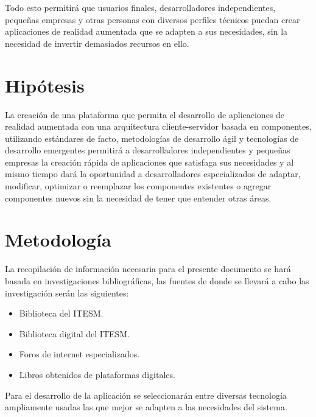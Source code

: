 \documentclass[12pt,a4paper,spanish,openany]{book}
\begin{document}

Todo esto permitirá que usuarios finales, desarrolladores
independientes, pequeñas empresas y otras personas con diversos perfiles
técnicos puedan crear aplicaciones de realidad aumentada que se adapten a sus
necesidades, sin la necesidad de invertir demasiados recursos en ello.


\section{Hipótesis}
La creación de una plataforma que permita el desarrollo de aplicaciones de
realidad aumentada con una arquitectura cliente-servidor basada en componentes,
utilizando estándares de facto, metodologías de desarrollo ágil y tecnologías de
desarrollo emergentes permitirá a desarrolladores independientes y
pequeñas empresas la creación rápida de aplicaciones que satisfaga
sus necesidades y al mismo tiempo dará la oportunidad a desarrolladores
especializados de adaptar, modificar, optimizar o reemplazar los
componentes existentes o agregar componentes nuevos sin la necesidad de tener
que entender otras áreas.

\section{Metodología}

La recopilación de información necesaria para el presente documento se hará
basada en investigaciones bibliográficas, las fuentes de donde se llevará a
cabo las investigación serán las siguientes:
\begin{itemize}
  \item Biblioteca del ITESM.
  \item Biblioteca digital del ITESM.
  \item Foros de internet especializados.
  \item Libros obtenidos de plataformas digitales.
\end{itemize}

Para el desarrollo de la aplicación se seleccionarán entre diversas
tecnología ampliamente usadas las que mejor se adapten a las necesidades del
sistema.
\end{document}
